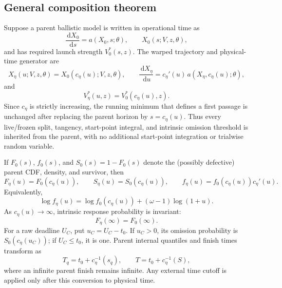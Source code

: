 \documentclass[12pt]{article}
\newcommand{\dd}{\,\mathrm{d}}
\theoremstyle{remark}
\begin{document}
\subsection{General composition theorem}
Suppose a parent ballistic model is written in operational time as
\begin{equation}
  \frac{\dd X_0}{\dd s}=a(X_0,s;\theta),
  \qquad
  X_0(s;V,z,\theta),
  \label{eq:time-warp-parent}
\end{equation}
and has required launch strength \(V_0^*(s,z)\). The warped trajectory and physical-time generator are
\begin{equation}
  X_\eta(u;V,z,\theta)=X_0(c_\eta(u);V,z,\theta),
  \qquad
  \frac{\dd X_\eta}{\dd u}
   =c_\eta'(u)\,a\!\left(X_\eta,c_\eta(u);\theta\right),
  \label{eq:time-warp-trajectory}
\end{equation}
and
\begin{equation}
  V_\eta^*(u,z)=V_0^*(c_\eta(u),z).
  \label{eq:time-warp-vstar}
\end{equation}
Since \(c_\eta\) is strictly increasing, the running minimum that defines a first passage is unchanged after replacing the parent horizon by \(s=c_\eta(u)\). Thus every live/frozen split, tangency, start-point integral, and intrinsic omission threshold is inherited from the parent, with no additional start-point integration or trialwise random variable.

If \(F_0(s)\), \(f_0(s)\), and \(S_0(s)=1-F_0(s)\) denote the (possibly defective) parent CDF, density, and survivor, then
\begin{equation}
  F_\eta(u)=F_0(c_\eta(u)),
  \qquad
  S_\eta(u)=S_0(c_\eta(u)),
  \qquad
  f_\eta(u)=f_0(c_\eta(u))c_\eta'(u).
  \label{eq:time-warp-law}
\end{equation}
Equivalently,
\begin{equation}
  \log f_\eta(u)=\log f_0(c_\eta(u))
       +(\omega-1)\log(1+u).
  \label{eq:time-warp-log-density}
\end{equation}
As \(c_\eta(u)\to\infty\), intrinsic response probability is invariant:
\begin{equation}
  F_\eta(\infty)=F_0(\infty).
  \label{eq:time-warp-defect}
\end{equation}
For a raw deadline \(U_C\), put \(u_C=U_C-t_0\). If \(u_C>0\), its omission probability is \(S_0(c_\eta(u_C))\); if \(U_C\le t_0\), it is one. Parent internal quantiles and finish times transform as
\begin{equation}
  T_q=t_0+c_\eta^{-1}(s_q),
  \qquad
  T=t_0+c_\eta^{-1}(S),
  \label{eq:time-warp-inversion}
\end{equation}
where an infinite parent finish remains infinite. Any external time cutoff is applied only after this conversion to physical time.
\end{document}

